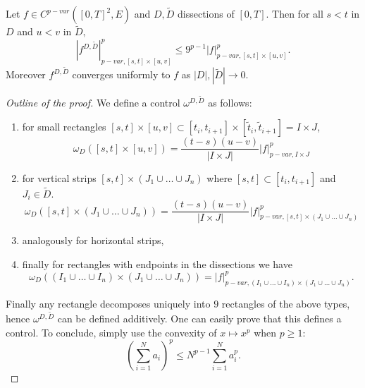 \begin{proposition}
    Let $f \in C^{p-var}([0,T]^2,E)$ and $D,\tilde{D}$ dissections of $[0,T].$ Then for all $s < t$ in $D$ and $u < v$ in $\tilde{D},$
    \begin{equation}
        \left| f^{D,\tilde{D}}\right| ^p_{p-var,[s,t] \times [u,v]}\leq 9^{p-1} |f|^p_{p-var,[s,t] \times [u,v]}.
    \end{equation}
    Moreover $f^{D,\tilde{D}}$ converges uniformly to $f$ as $|D|,|\tilde{D}| \rightarrow 0.$
\end{proposition}
\begin{proof}[Outline of the proof]
    We define a control $\omega^{D,\tilde{D}}$ as follows:
    \begin{enumerate}
        \item for small rectangles $[s,t] \times [u,v] \subset [t_i,t_{i+1}] \times [\tilde{t}_i,\tilde{t}_{i+1}] = I \times J$,
        \begin{equation}
            \omega_D([s,t] \times [u,v]) = \frac{(t - s)(u - v)}{|I \times J|} |f|_{p-var,I \times J}^p
        \end{equation}
        \item for vertical strips $[s,t] \times (J_1 \cup \ldots \cup J_n)$ where $[s,t] \subset [t_i, t_{i+1}]$ and $J_i \in \tilde{D}.$
        \begin{equation}
            \omega_D([s,t] \times (J_1 \cup \ldots \cup J_n)) = \frac{(t - s)(u - v)}{|I \times J|} |f|_{p-var,[s,t] \times (J_1 \cup \ldots \cup J_n)}^p
        \end{equation}
        \item analogously for horizontal strips,
        \item finally for rectangles with endpoints in the dissections we have
        \begin{equation}
            \omega_D((I_1 \cup \ldots \cup I_n) \times (J_1 \cup \ldots \cup J_n)) = |f|^p_{p-var,(I_1 \cup \ldots \cup I_n) \times (J_1 \cup \ldots \cup J_n)}.
        \end{equation}
    \end{enumerate}
    Finally any rectangle decomposes uniquely into $9$ rectangles of the above types, hence $\omega^{D,\tilde{D}}$ can be defined additively.
    One can easily prove that this defines a control.
    To conclude, simply use the convexity of $x \mapsto x^p$ when $p \ge 1:$
    \begin{equation}
        \left(\sum_{i = 1}^N a_i \right)^p \le N^{p-1} \sum_{i=1}^N a_i^p.
    \end{equation}
\end{proof}

